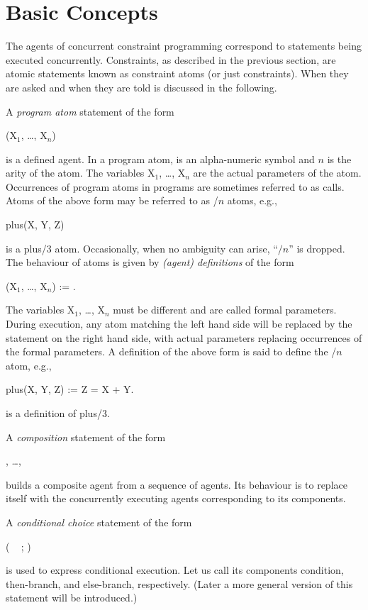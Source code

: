 \section{Basic Concepts}

The agents of concurrent constraint programming correspond to
statements being executed concurrently.  Constraints, as described in
the previous section, are atomic statements known as constraint atoms
(or just constraints).  When they are asked and when they are told is
discussed in the following.

A {\em program atom} statement of the form
%
\begin{progex}
(X$_1$, \dots, X$_n$)
\end{progex}%
%
is a defined agent.  In a program atom,  is an alpha-numeric
symbol and $n$ is the arity of the atom.  The variables {\prog X$_1$,
\dots, X$_n$} are the actual parameters of the atom.  Occurrences of
program atoms in programs are sometimes referred to as calls.  Atoms of
the above form may be referred to as {\prog {}/$n$} atoms,
e.g.,
%
\begin{progex}
plus(X, Y, Z)
\end{progex}%
%
is a {\prog plus/3} atom.  Occasionally, when no ambiguity can arise,
``$/n$'' is dropped.  The behaviour of atoms is given by {\em (agent)
definitions} of the form
%
\begin{progex}
(X$_1$, \dots, X$_n$) := .
\end{progex}%
%
The variables {\prog X$_1$, \dots, X$_n$} must be different and are
called formal parameters.  During execution, any atom matching the left
hand side will be replaced by the statement on the right hand side,
with actual parameters replacing occurrences of the formal
parameters.  A definition of the above form is said to define the
{\prog {}/$n$} atom, e.g.,
%
\begin{progex}
plus(X, Y, Z) := Z = X + Y.
\end{progex}%
%
is a definition of {\prog plus/3}.

A {\em composition} statement of the form
%
\begin{progex}
, \dots, 
\end{progex}%
%
builds a composite agent from a sequence of agents.  Its behaviour is
to replace itself with the concurrently executing agents corresponding
to its components.

A {\em conditional choice} statement of the form
%
\begin{progex}
( \cond\  ; )
\end{progex}%
%
is used to express conditional execution.  Let us call its components
condition, then-branch, and else-branch, respectively.  (Later a more
general version of this statement will be introduced.)

